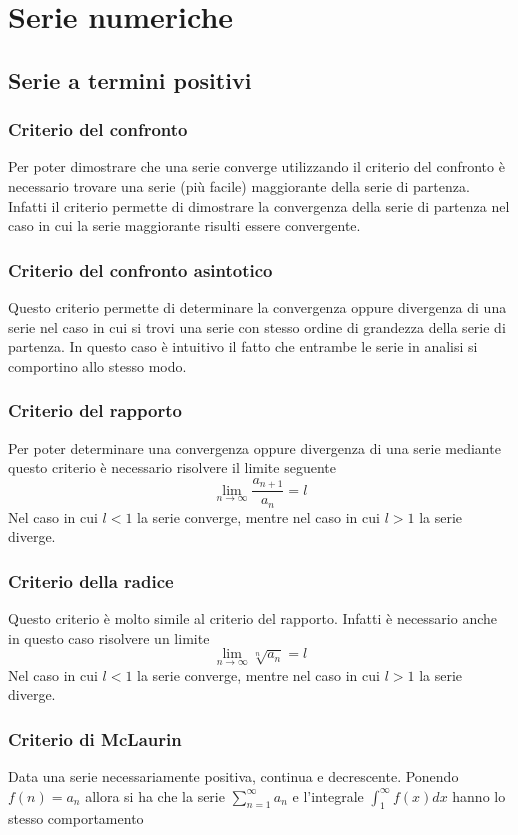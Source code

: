 \documentclass[10pt,a4paper]{report}
\begin{document}
    \section*{Serie numeriche}
        
                
            \subsection*{Serie a termini positivi}

                \subsubsection{Criterio del confronto}
                Per poter dimostrare che una serie converge utilizzando il criterio del confronto è necessario trovare una serie (più facile) maggiorante della serie di partenza. Infatti il criterio permette di dimostrare la convergenza della serie di partenza nel caso in cui la serie maggiorante risulti essere convergente.
                \subsubsection{Criterio del confronto asintotico}
                Questo criterio permette di determinare la convergenza oppure divergenza di una serie nel caso in cui si trovi una serie con stesso ordine di grandezza della serie di partenza. In questo caso è intuitivo il fatto che entrambe le serie in analisi si comportino allo stesso modo.
                \subsubsection{Criterio del rapporto}
                Per poter determinare una convergenza oppure divergenza di una serie mediante questo criterio è necessario risolvere il limite seguente \[ \lim_{n \to \infty} \frac{a_{n+1}}{a_{n}} =l \] Nel caso in cui $ l < 1 $ la serie converge, mentre nel caso in cui $ l > 1 $ la serie diverge.
                \subsubsection{Criterio della radice}
                Questo criterio è molto simile al criterio del rapporto. Infatti è necessario anche in questo caso risolvere un limite \[ \lim_{n \to \infty} \sqrt[n]{a_{n}} = l \] Nel caso in cui $ l < 1 $ la serie converge, mentre nel caso in cui $ l > 1 $ la serie diverge.
                \subsubsection{Criterio di McLaurin}
                Data una serie necessariamente positiva, continua e decrescente. Ponendo $ f(n) = a_{n} $ allora si ha che la serie $ \sum_{n=1}^{\infty} a_{n} $ e l'integrale $ \int_{1}^{\infty} f(x)dx $ hanno lo stesso comportamento 
                
\end{document}
